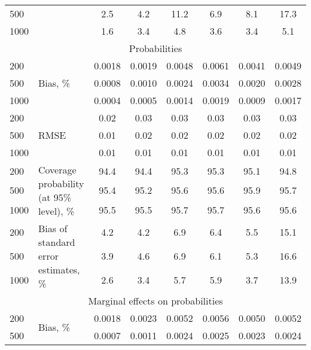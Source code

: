 \documentclass[letterpaper,fleqn,11pt]{article}
\begin{document}
\begin{table}[htbp]
\begin{tabular}{rrcccccc}
\multicolumn{1}{l}{500} & \multicolumn{1}{l}{} & 2.5   & 4.2   & 11.2  & 6.9   & 8.1   & 17.3 \\
\multicolumn{1}{l}{1000} & \multicolumn{1}{l}{} & 1.6   & 3.4   & 4.8   & 3.6   & 3.4   & 5.1 \\
\multicolumn{8}{c}{Probabilities} \\ 
\multicolumn{1}{l}{200} & \multicolumn{1}{l}{\multirow{3}[1]{*}{Bias, \%}} & 0.0018 & 0.0019 & 0.0048 & 0.0061 & 0.0041 & 0.0049 \\
\multicolumn{1}{l}{500} & \multicolumn{1}{l}{} & 0.0008 & 0.0010 & 0.0024 & 0.0034 & 0.0020 & 0.0028 \\
\multicolumn{1}{l}{1000} & \multicolumn{1}{l}{} & 0.0004 & 0.0005 & 0.0014 & 0.0019 & 0.0009 & 0.0017 \\
\multicolumn{1}{l}{200} & \multicolumn{1}{l}{\multirow{3}[2]{*}{RMSE}} & 0.02  & 0.03  & 0.03  & 0.03  & 0.03  & 0.03 \\
\multicolumn{1}{l}{500} & \multicolumn{1}{l}{} & 0.01  & 0.02  & 0.02  & 0.02  & 0.02  & 0.02 \\
\multicolumn{1}{l}{1000} & \multicolumn{1}{l}{} & 0.01  & 0.01  & 0.01  & 0.01  & 0.01  & 0.01 \\
\multicolumn{1}{l}{200} & \multicolumn{1}{l}{\multirow{3}[2]{4cm}{Coverage
probability (at 95\% level), \%}} & 94.4  & 94.4  & 95.3  & 95.3  & 95.1  & 94.8 \\
\multicolumn{1}{l}{500} & \multicolumn{1}{l}{} & 95.4  & 95.2  & 95.6  & 95.6  & 95.9  & 95.7 \\
\multicolumn{1}{l}{1000} & \multicolumn{1}{l}{} & 95.5  & 95.5  & 95.7  & 95.7  & 95.6  & 95.6 \\
\multicolumn{1}{l}{200} & \multicolumn{1}{l}{\multirow{3}[2]{4cm}{Bias of
standard error estimates, \%}} & 4.2   & 4.2   & 6.9   & 6.4   & 5.5   & 15.1 \\
\multicolumn{1}{l}{500} & \multicolumn{1}{l}{} & 3.9   & 4.6   & 6.9   & 6.1   & 5.3   & 16.6 \\
\multicolumn{1}{l}{1000} & \multicolumn{1}{l}{} & 2.6   & 3.4   & 5.7   & 5.9   & 3.7   & 13.9 \\
\multicolumn{8}{c}{Marginal effects on probabilities} \\ 
\multicolumn{1}{l}{200} & \multicolumn{1}{l}{\multirow{3}[1]{*}{Bias, \%}} & 0.0018 & 0.0023 & 0.0052 & 0.0056 & 0.0050 & 0.0052 \\
\multicolumn{1}{l}{500} & \multicolumn{1}{l}{} & 0.0007 & 0.0011 & 0.0024 & 0.0025 & 0.0023 & 0.0024 \\

\end{tabular}
\end{table}
\end{document}
